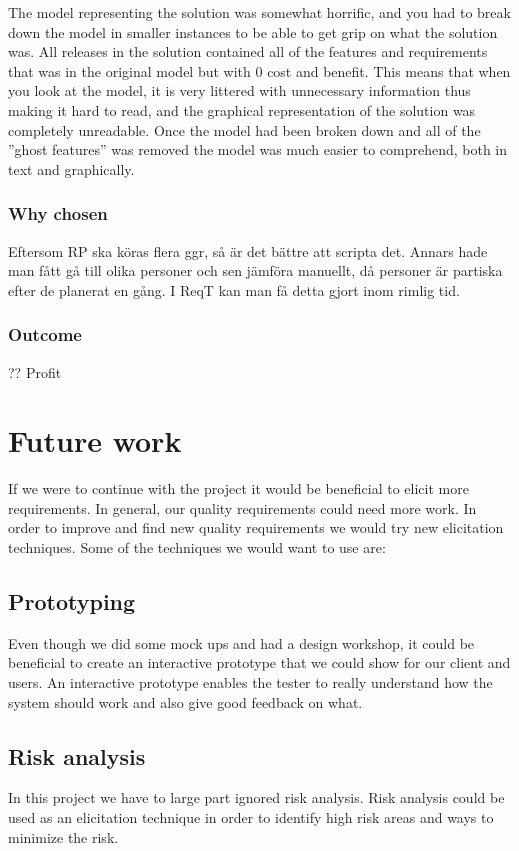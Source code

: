 \documentclass[a4paper]{article}
\begin{document}
				The model representing the solution was somewhat horrific, and you had to break down the model in smaller instances to be able to get grip on what the solution was. All releases in the solution contained all of the features and requirements that was in the original model but with 0 cost and benefit. This means that when you look at the model, it is very littered with unnecessary information thus making it hard to read, and the graphical representation of the solution was completely unreadable. Once the model had been broken down and all of the ''ghost features'' was removed the model was much easier to comprehend, both in text and graphically.

			\subsubsection{Why chosen}
				
				Eftersom RP ska köras flera ggr, så är det bättre att scripta det. Annars hade man fått gå till olika personer och sen jämföra manuellt, då personer är partiska efter de planerat en gång. I ReqT kan man få detta gjort inom rimlig tid.

			\subsubsection{Outcome}
				??
				Profit

	\section{Future work}
If we were to continue with the project it would be beneficial to elicit more requirements. In general, our quality requirements could need more work. In order to improve and find new quality requirements we would try new elicitation techniques. Some of the techniques we would want to use are:
	\subsection*{Prototyping}
	Even though we did some mock ups and had a design workshop, it could be beneficial to create an interactive prototype that we could show for our client and users. An interactive prototype enables the tester to really understand how the system should work and also give good feedback on what.
	\subsection*{Risk analysis}
	In this project we have to large part ignored risk analysis. Risk analysis could be used as an elicitation technique in order to identify high risk areas and ways to minimize the risk.
\end{document}
